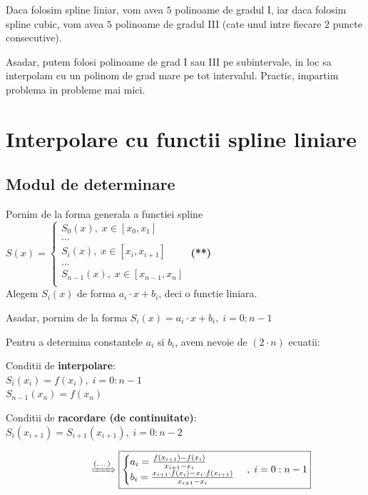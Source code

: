 \documentclass{article}
\begin{document}
Daca folosim spline liniar, vom avea $5$ polinoame de gradul I, iar daca folosim spline cubic, vom avea $5$ polinoame de gradul III (cate unul intre fiecare 2 puncte consecutive).

Asadar, putem folosi polinoame de grad I sau III pe subintervale, in loc sa interpolam cu un polinom de grad mare pe tot intervalul. Practic, impartim problema in probleme mai mici.

\section{Interpolare cu functii spline liniare}
\label{sec:liniare}

\subsection{Modul de determinare}
\tab Pornim de la forma generala a functiei spline
$S(x) = \begin{cases}
    S_0(x),\; x \in [x_0, x_1]\\
    \dots\\
    S_i(x),\; x \in [x_i, x_{i+1}]\\
    \dots\\
    S_{n-1}(x),\; x \in [x_{n-1}, x_n]\\
\end{cases}$ \textbf{(**)}\\

Alegem $S_i(x)$ de forma $a_i \cdot x + b_i$, deci o functie liniara.

Asadar, pornim de la forma $S_i(x) = a_i \cdot x + b_i,\; i = 0 : n-1$

Pentru a determina constantele $a_i$ si $b_i$, avem nevoie de $(2 \cdot n)$ ecuatii:

\begin{center}
    \begin{minipage}[t]{0.4\textwidth}
    Conditii de \textbf{interpolare}:\\
        $S_i(x_i) = f(x_i),\; i = 0 : n-1$\\
        $S_{n-1}(x_n) = f(x_n)$
    \end{minipage}
    \begin{minipage}[t]{0.5\textwidth}
        Conditii de \textbf{racordare (de continuitate)}:
        $S_i(x_{i+1}) = S_{i+1}(x_{i+1}),\; i = 0 : n-2$
    \end{minipage}
\end{center}

$\hspace{3cm}\xRightarrow[\text{}]{\text{(\dots)}} \framebox{$\begin{cases}
    a_i = \frac{f(x_{i+1}) - f(x_i)}{x_{i+1} - x_i}\\
    b_i = \frac{x_{i+1} \cdot f(x_i) - x_i \cdot f(x_{i+1})}{x_{i+1} - x_i}
\end{cases},\; i = 0 : n-1$}$
\end{document}
